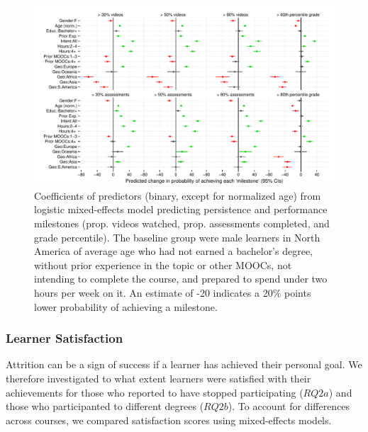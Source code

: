 \documentclass{sigchi}\usepackage[]{graphicx}\usepackage[]{color}
\makeatletter
\def\maxwidth{ %
  \ifdim\Gin@nat@width>\linewidth
    \linewidth
  \else
    \Gin@nat@width
  \fi
}
\newenvironment{knitrout}{}{} %
\makeatother
\begin{document}
\begin{knitrout}
\color{fgcolor}\begin{figure}[ht]

\includegraphics[width=\maxwidth]{figure/s1coefs} \caption[Coefficients of predictors (binary, except for normalized age) from logistic mixed-effects model predicting persistence and performance milestones (prop]{Coefficients of predictors (binary, except for normalized age) from logistic mixed-effects model predicting persistence and performance milestones (prop. videos watched, prop. assessments completed, and grade percentile). The baseline group were male learners in North America of average age who had not earned a bachelor's degree, without prior experience in the topic or other MOOCs, not intending to complete the course, and prepared to spend under two hours per week on it. An estimate of -20 indicates a 20\% points lower probability of achieving a milestone.\label{fig:s1coefs}}
\end{figure}


\end{knitrout}

\subsubsection{Learner Satisfaction}

Attrition can be a sign of success if a learner has achieved their personal goal. We therefore investigated to what extent learners were satisfied with their achievements for those who reported to have stopped participating ($RQ2a$) and those who participanted to different degrees ($RQ2b$). To account for differences across courses, we compared satisfaction scores using mixed-effects models.
\end{document}
